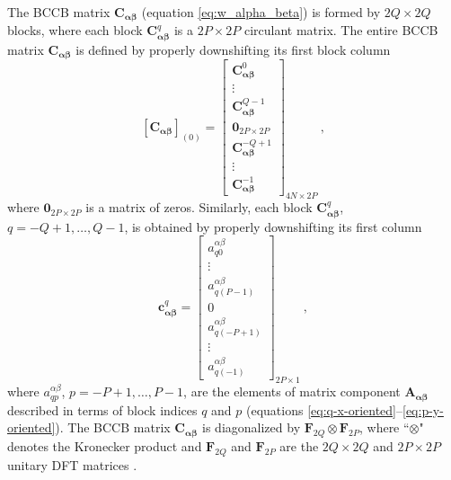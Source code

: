 \documentclass[manuscript,noblind]{geophysics}
\begin{document}
The BCCB matrix $\mathbf{C}_{\boldsymbol{\alpha\beta}}$ (equation \ref{eq:w_alpha_beta})
is formed by $2Q \times 2Q$ blocks, 
where each block $\mathbf{C}_{\boldsymbol{\alpha\beta}}^{q}$ is a $2P \times 2P$ circulant matrix.
The entire BCCB matrix $\mathbf{C}_{\boldsymbol{\alpha\beta}}$ is defined by properly
downshifting its first block column
\begin{equation}
	\left[ \mathbf{C}_{\boldsymbol{\alpha\beta}} \right]_{(0)} = \begin{bmatrix}
		\mathbf{C}_{\boldsymbol{\alpha\beta}}^{0} \\
		\vdots \\
		\mathbf{C}_{\boldsymbol{\alpha\beta}}^{Q-1} \\
		\mathbf{0}_{2P \times 2P} \\
		\mathbf{C}_{\boldsymbol{\alpha\beta}}^{-Q+1} \\
		\vdots \\
		\mathbf{C}_{\boldsymbol{\alpha\beta}}^{-1}
	\end{bmatrix}_{4N \times 2P} \: ,
	\label{eq:C_alpha_beta_first_block_column}
\end{equation}
where $\mathbf{0}_{2P \times 2P}$ is a matrix of zeros. Similarly, 
each block $\mathbf{C}_{\boldsymbol{\alpha\beta}}^{q}$, $q = -Q+1, \dots, Q-1$,
is obtained by properly downshifting its first column
\begin{equation}
	\mathbf{c}_{\boldsymbol{\alpha\beta}}^{q} = \begin{bmatrix}
		a^{\alpha\beta}_{q0} \\
		\vdots \\
		a^{\alpha\beta}_{q(P-1)} \\
		0 \\
		a^{\alpha\beta}_{q(-P+1)} \\
		\vdots \\
		a^{\alpha\beta}_{q(-1)}
	\end{bmatrix}_{2P \times 1} \: ,
	\label{eq:cq_alpha_beta}
\end{equation}
where $a^{\alpha\beta}_{qp}$, $p = -P+1, \dots, P-1$, are the elements of
matrix component $\mathbf{A_{\boldsymbol{\alpha\beta}}}$ described in terms of
block indices $q$ and $p$ (equations \ref{eq:q-x-oriented}--\ref{eq:p-y-oriented}). 
The BCCB matrix $\mathbf{C}_{\boldsymbol{\alpha\beta}}$ is diagonalized by
$\mathbf{F}_{2Q} \otimes \mathbf{F}_{2P}$, where ``$\otimes$" denotes the Kronecker product
\citep[e.g.,][ p. 242]{horn_johnson1991} and $\mathbf{F}_{2Q}$ and $\mathbf{F}_{2P}$ are 
the $2Q \times 2Q$ and $2P \times 2P$ unitary DFT matrices \citep[][ p. 31]{davis1979}.
\end{document}
